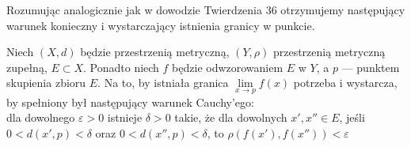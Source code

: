 \documentclass[leqno]{article}
\begin{document}
\begin{justify}
Rozumując analogicznie jak w dowodzie Twierdzenia 36 otrzymujemy następujący warunek konieczny i wystarczający istnienia granicy w punkcie.

\begin{theorem}
{
    Niech $(X, d)$ będzie przestrzenią metryczną, $(Y, \rho)$ przestrzenią metryczną zupełną, $E \subset X$.
    Ponadto niech $f$ będzie odwzorowaniem $E$ w $Y$, a $p$ --- punktem skupienia zbioru $E$.
    Na to, by istniała granica $\lim\limits_{x \to p}f(x)$ potrzeba i wystarcza, by spełniony
    był następujący warunek Cauchy'ego: \\
    dla dowolnego $\varepsilon > 0$ istnieje $\delta > 0$ takie, że 
    dla dowolnych $x', x'' \in E$, jeśli $0 < d(x', p) < \delta$ oraz $0 < d(x'', p) < \delta$, to $\rho(f(x'), f(x'')) < \varepsilon$
}
\end{theorem}


\end{justify}
\end{document}
